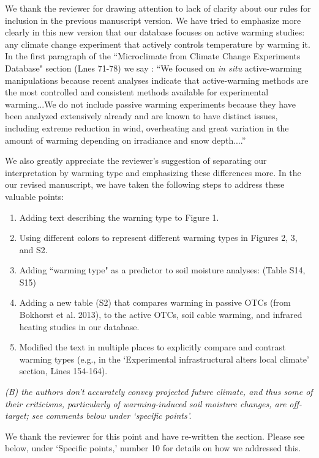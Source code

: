 \documentclass[11pt,a4paper]{letter}
\begin{document}
\begin{letter}{}
\par We thank the reviewer for drawing attention to lack of clarity about our rules for inclusion in the previous manuscript version. We have tried to emphasize more clearly in this new version that our database focuses on active warming studies: any climate change experiment that actively controls temperature by warming it. In the first paragraph of the ``Microclimate from Climate Change Experiments Database" section (Lnes 71-78) we say : ``We focused on \textit{in situ} active-warming manipulations because recent analyses indicate that active-warming methods are the most controlled and consistent methods available for experimental warming...We do not include passive warming experiments because they have been analyzed extensively already and are known to have distinct issues, including extreme reduction in wind, overheating and great variation in the amount of warming depending on irradiance and snow depth....''
\par We also greatly appreciate the reviewer's suggestion of separating our interpretation by warming type and emphasizing these differences more. In the our revised manuscript, we have taken the following steps to address these valuable points:
\begin{enumerate}
\item Adding text describing the warning type to Figure 1.
\item Using different colors  to represent different warming types in Figures 2, 3, and S2.
\item Adding ``warming type" as a predictor to soil moisture analyses: (Table S14, S15)
\item Adding a new table (S2) that compares warming in passive OTCs (from Bokhorst et al. 2013), to the active OTCs, soil cable warming, and infrared heating studies in our database.
\item Modified the text in multiple places to explicitly compare and contrast warming types (e.g., in the `Experimental infrastructural alters local climate' section, Lines 154-164). 
\end{enumerate}


\par \emph{(B) the authors don't accurately convey projected future climate, and thus some of their criticisms, particularly of warming-induced soil moisture changes, are off-target; see comments below under `specific points'.}

\par We thank the reviewer for this point and have re-written the section. Please see below, under `Specific points,' number 10 for details on how we addressed this. 


\end{letter}
\end{document}
